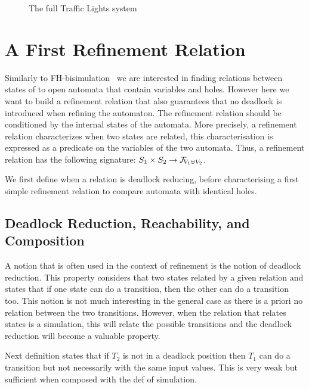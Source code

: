 \documentclass[runningheads]{llncs}
\begin{document}
\begin{figure}[!tb]
\centering
\scalebox{.75}{}
\caption{The full Traffic Lights system}
\label{fig:tlf}
\end{figure}


\section{A First Refinement Relation}\label{sec:refinement}

Similarly to FH-bisimulation~\cite{fhbisim} we are interested  in finding relations between states of to open automata that contain variables and holes. However here we want to build a refinement relation that  also guarantees that no deadlock is introduced when refining the automaton.
The refinement relation should be conditioned by the internal states of the automata. More precisely, a refinement relation characterizes when two states are related, this  characterisation is expressed as a predicate on the variables of the two automata.
Thus, a refinement relation has the following signature: \( S_1 \times S_2 \to \rformulas[V_1 \uplus V_2]\).

We first define when a relation is deadlock reducing, before characterising a first simple refinement relation  to compare automata with identical holes.

\subsection{Deadlock Reduction, Reachability, and Composition}

A notion that is often used in the context of refinement is the notion of deadlock reduction. This property considers that two states related by a given relation and states that if one state can do a transition, then the other can do a transition too. This notion is not much interesting in the general case as there is a priori no relation between the two transitions. However, when the relation that relates states is a simulation, this will relate the possible transitions and the deadlock reduction will become a valuable property.

Next definition states that if $T_2$ is not in a deadlock position then $T_1$ can do a transition but not necessarily with the same input values. This is very weak but sufficient when composed with the def  of simulation.
\end{document}
